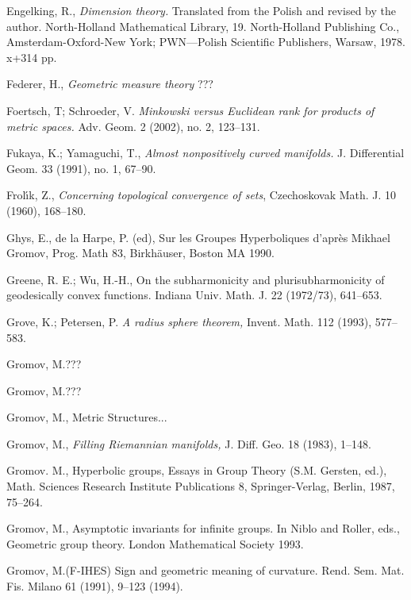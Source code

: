 \begin{thebibliography}{52}
 Engelking, R., \textit{Dimension theory.} Translated from the Polish and revised by the author. North-Holland Mathematical Library, 19. North-Holland Publishing Co., Amsterdam-Oxford-New York; PWN---Polish Scientific Publishers, Warsaw, 1978. x+314 pp.

Federer, H., \textit{Geometric measure theory} ???

Foertsch, T;  Schroeder, V. \textit{Minkowski versus Euclidean rank for products of metric spaces.}  Adv. Geom.  2  (2002),  no. 2, 123--131.

Fukaya, K.; Yamaguchi, T., \textit{Almost nonpositively curved manifolds.}  J. Differential Geom.  33  (1991),  no. 1, 67--90.

 Frol\'{\i}k, Z., \textit{Concerning topological convergence of sets}, Czechoskovak Math. J. 10 (1960), 168--180.

   Ghys, E., de la Harpe, P. (ed), Sur les Groupes Hyperboliques d'apr\`{e}s Mikhael Gromov, Prog. Math 83, Birkh\"{a}user, Boston MA 1990.


 Greene, R. E.; Wu, H.-H., On the subharmonicity and plurisubharmonicity of geodesically convex
functions.
Indiana Univ. Math. J. 22 (1972/73), 641--653.

  Grove, K.; Petersen, P. \textit{A radius sphere theorem,}
Invent. Math. 112 (1993), 577--583.

Gromov, M.???

 Gromov, M.???

 Gromov, M., Metric Structures...

  Gromov, M., \textit{Filling Riemannian manifolds,} J. Diff. Geo. 18 (1983), 1--148.


Gromov. M.,
Hyperbolic groups, 
Essays in Group Theory (S.M. Gersten, ed.),
Math. Sciences Research Institute Publications 8,
Springer-Verlag, Berlin,
1987, 75--264.

Gromov, M., Asymptotic invariants for infinite groups. 
In Niblo and Roller, eds.,
Geometric group theory. London Mathematical Society 1993.

Gromov, M.(F-IHES)
Sign and geometric meaning of curvature. 
Rend. Sem. Mat. Fis. Milano 61 (1991), 9--123 (1994). 


\end{thebibliography}
